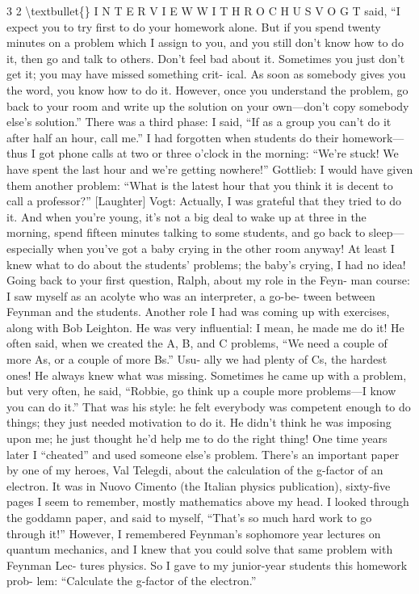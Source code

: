 \documentclass[10pt,oneside]{article}
\begin{document}
3 2 \textbackslash{}textbullet\{\} I N T E R V I E W  W I T H  R O C H U S  V O G T said, “I expect you to try first to do your homework alone. But if you spend twenty minutes on a problem which I assign to you, and you still don’t know how to do it, then go and talk to others. Don’t feel bad about it. Sometimes you just don’t get it; you may have missed something crit- ical. As soon as somebody gives you the word, you know how to do it. However, once you understand the problem, go back to your room and write up the solution on your own---don’t copy somebody else’s solution.” There was a third phase: I said, “If as a group you can’t do it after half an hour, call me.” I had forgotten when students do their homework--- thus I got phone calls at two or three o’clock in the morning: “We’re stuck! We have spent the last hour and we’re getting nowhere!” Gottlieb: I would have given them another problem: “What is the latest hour that you think it is decent to call a professor?” [Laughter] Vogt: Actually, I was grateful that they tried to do it. And when you’re young, it’s not a big deal to wake up at three in the morning, spend fifteen minutes talking to some students, and go back to sleep---especially when you’ve got a baby crying in the other room anyway! At least I knew what to do about the students’ problems; the baby’s crying, I had no idea! Going back to your first question, Ralph, about my role in the Feyn- man course: I saw myself as an acolyte who was an interpreter, a go-be- tween between Feynman and the students. Another role I had was coming up with exercises, along with Bob Leighton. He was very influential: I mean, he made me do it! He often said, when we created the A, B, and C problems, “We need a couple of more As, or a couple of more Bs.” Usu- ally we had plenty of Cs, the hardest ones! He always knew what was missing. Sometimes he came up with a problem, but very often, he said, “Robbie, go think up a couple more problems---I know you can do it.” That was his style: he felt everybody was competent enough to do things; they just needed motivation to do it. He didn’t think he was imposing upon me; he just thought he’d help me to do the right thing! One time years later I “cheated” and used someone else’s problem. There’s an important paper by one of my heroes, Val Telegdi, about the calculation of the g-factor of an electron. It was in Nuovo Cimento (the Italian physics publication), sixty-five pages I seem to remember, mostly mathematics above my head. I looked through the goddamn paper, and said to myself, “That’s so much hard work to go through it!” However, I remembered Feynman’s sophomore year lectures on quantum mechanics, and I knew that you could solve that same problem with Feynman Lec- tures physics. So I gave to my junior-year students this homework prob- lem: “Calculate the g-factor of the electron.”\par
\end{document}
